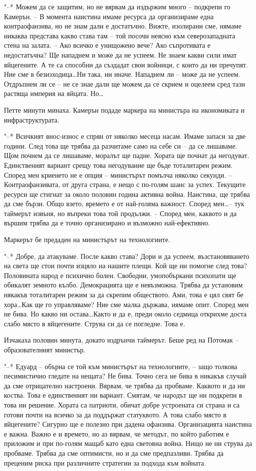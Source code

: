 \documentclass[ebook,openany,12pt]{memoir}
\begin{document}
"--* Можем да се защитим, но не вярвам да издържим много – подкрепи го Камерън. – В момента наистина имаме ресурса да организираме една контраофанзива, но не знам дали е достатъчно. Вижте, изолирани сме, нямаме никаква представа какво става там – той посочи неясно към северозападната стена на залата. – Ако всичко е унищожено вече? Ако съпротивата е недостатъчна? Ще нападнем и може да не успеем. Не знаем какви сили имат яйцегените. А те са способни да създадат свои войници, с които да ни пречупят. Ние сме в безизходица\ldots Ни така, ни иначе. Нападнем ли – може да не успеем. Отдръпнем ли се – не се знае дали ще можем да се скрием и оцелеем сред тази растяща империя на яйцата. Но\ldots

Петте минути минаха. Камерън подаде маркера на министъра на икономиката и инфраструктурата.

"--* Всичкият внос-износ е спрян от няколко месеца насам. Имаме запаси за две години. След това ще трябва да разчитаме само на себе си – да се лишаваме. Щом почнем да се лишаваме, моралът ще падне. Хората ще почнат да негодуват. Единственият вариант срещу това негодувание ще бъде тоталитарен режим. Според мен криенето не е опция – министърът помълча няколко секунди. – Контраофанзивата, от друга страна, е нещо с по-голям шанс за успех. Текущите ресурси ще стигнат за около половин година активна война. Наистина, ще трябва да сме бързи. Общо взето, времето е от най-голяма важност. Според мен\ldots -- тук таймерът извъня, но въпреки това той продължи. – Според мен, каквото и да вършим трябва да е точно организирано и възможно най-ефективно.

Маркерът бе предаден на министърът на технологиите.

"--* Добре, да атакуваме. После какво става? Дори и да успеем, възстановяването на света ще стои почти изцяло на нашите плещи. Кой ще ни помогне след това? Половината народ е психично болен. Свободни, умопобъркани психопати ще обикалят земното кълбо. Демокрацията ще е невъзможна. Трябва да установим някакъв тоталитарен режим за да скрепим обществото. Ами, това е цял свят бе хора\ldots Как ще го управляваме? Ние сме малка държава, нямаме опит. Според мен не бива. Но какво ни остава\ldots Както и да е, преди около седмица открихме доста слабо място в яйцегените. Струва си да се погледне. Това е.

Изчакаха половин минута, докато издрънчи таймерът. Беше ред на Потомак – образователният министър.

"--* Едуард – обърна се той към министърът на технологиите, – защо толкова песимистично гледате на нещата? Не бива. Точно сега не бива в никакъв случай да сме отрицателно настроени. Вярвам, че трябва да пробваме. Каквото и да ни коства. Това е единственият ни вариант. Смятам, че народът ще ни подкрепи в това ни решение. Хората са патриоти, обичат добре устроената си страна и са готови почти на всичко за да поддържат статуквото. А това слабо място в яйцегените? Сигурно ще е полезно при дадена офанзива. Организацията наистина е важна. Важно е и времето, но аз вярвам, че методът, по който работим е приложим и при по-голям мащаб като една световна война. Нищо не ни струва да пробваме. Трябва да сме оптимисти, но и да сме предпазливи. Трябва да преценим риска при различните стратегии за подхода към войната.
\end{document}
